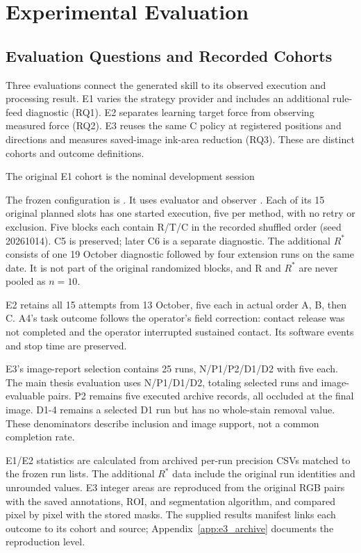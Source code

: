 \chapter{Experimental Evaluation}
\label{chap:experiments}

\section{Evaluation Questions and Recorded Cohorts}
Three evaluations connect the generated skill to its observed execution and processing result. E1 varies the strategy provider and includes an additional rule-feed diagnostic (RQ1). E2 separates learning target force from observing measured force (RQ2). E3 reuses the same C policy at registered positions and directions and measures saved-image ink-area reduction (RQ3). These are distinct cohorts and outcome definitions.

The original E1 cohort is the nominal development session
\begin{quote}\small{}\end{quote}
The frozen configuration is . It uses evaluator  and observer . Each of its 15 original planned slots has one started execution, five per method, with no retry or exclusion. Five blocks each contain R/T/C in the recorded shuffled order (seed 20261014). C5 is preserved; later C6 is a separate diagnostic. The additional \(R^{*}\) consists of one 19 October diagnostic followed by four extension runs on the same date. It is not part of the original randomized blocks, and R and \(R^{*}\) are never pooled as \(n=10\).

E2 retains all 15 attempts from 13 October, five each in actual order A, B, then C. A4's task outcome follows the operator's field correction: contact release was not completed and the operator interrupted sustained contact. Its software events and stop time are preserved.

E3's image-report selection contains 25 runs, N/P1/P2/D1/D2 with five each. The main thesis evaluation uses N/P1/D1/D2, totaling \EthreeMainN{} selected runs and \EthreeImageN{} image-evaluable pairs. P2 remains five executed archive records, all occluded at the final image. D1-4 remains a selected D1 run but has no whole-stain removal value. These denominators describe inclusion and image support, not a common completion rate.

E1/E2 statistics are calculated from archived per-run precision CSVs matched to the frozen run lists. The additional \(R^{*}\) data include the original run identities and unrounded values. E3 integer areas are reproduced from the original RGB pairs with the saved annotations, ROI, and segmentation algorithm, and compared pixel by pixel with the stored masks. The supplied results manifest links each outcome to its cohort and source; Appendix~\ref{app:e3_archive} documents the reproduction level.

